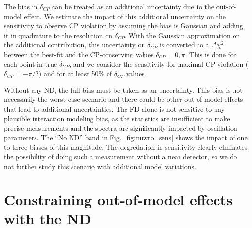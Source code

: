 \documentclass[11pt]{article}
\begin{document}
The bias in $\delta_{CP}$ can be treated as an additional uncertainty due to the out-of-model effect. We estimate the impact of this additional uncertainty on the sensitivity to observe CP violation by assuming the bias is Gaussian and adding it in quadrature to the resolution on $\delta_{CP}$. With the Gaussian approximation on the additional contribution, this uncertainty on $\delta_{CP}$ is converted to a $\Delta \chi^{2}$ between the best-fit and the CP-conserving values $\delta_{CP} = 0,\pi$. This is done for each point in true $\delta_{CP}$, and we consider the sensitivity for maximal CP violation ($\delta_{CP} = -\pi/2$) and for at least 50\% of $\delta_{CP}$ values.

Without any ND, the full bias must be taken as an uncertainty. This bias is not necessarily the worst-case scenario and there could be other out-of-model effects that lead to additional uncertainties. The FD alone is not sensitive to any plausible interaction modeling bias, as the statistics are insufficient to make precise measurements and the spectra are significantly impacted by oscillation parameters. The ``No ND'' band in Fig.~\ref{fig:nuwro_sens} shows the impact of one to three biases of this magnitude. The degredation in sensitivity clearly elminates the possibility of doing such a measurement without a near detector, so we do not further study this scenario with additional model variations.

\section{Constraining out-of-model effects with the ND}
\label{sec:ndconstraint}
\end{document}
